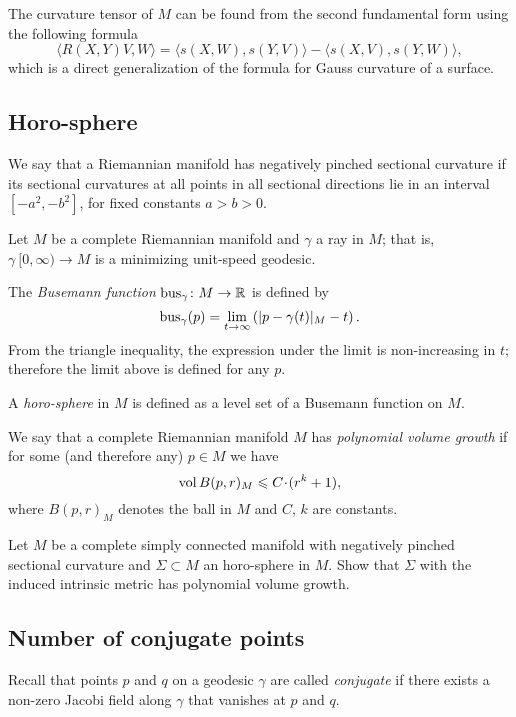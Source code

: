 The curvature tensor of $M$ can be found from the second fundamental form using the following  formula
\[\langle R(X,Y)V,W\rangle=\langle s(X,W),s(Y,V)\rangle-\langle s(X,V),s(Y,W)\rangle,\]
which is a direct generalization of the formula for Gauss curvature of a surface.


\subsection*{Horo-sphere}
\label{Horosphere}

We say that a Riemannian manifold has negatively pinched sectional curvature if its sectional curvatures at all points in all sectional directions lie in an interval $[-a^2, -b^2]$, for fixed constants $a>b>0$.

Let $M$ be a complete Riemannian manifold
and $\gamma$ a ray in $M$; 
that is, $\gamma\:[0, \infty)\to M$ is a minimizing unit-speed geodesic.

The \label{page:Busemann function}\emph{Busemann function} $\operatorname{\rm bus}\nolimits_\gamma\colon M\to\mathbb{R}$ is defined by
$$\operatorname{\rm bus}\nolimits_\gamma(p)=\lim_{t\to\infty}\left(|p-\gamma(t)|_M-t\right).$$
From the triangle inequality, 
the expression under the limit is non-increasing in $t$; 
therefore  the limit above is defined for any $p$.

A \emph{horo-sphere} in $M$ is defined as a level set of a Busemann function
on $M$.

We say that a complete Riemannian manifold $M$ has \emph{polynomial volume growth} if for some (and therefore any) $p\in M$ we have 
$$\vol B(p,r)_M\z\le C\cdot (r^k+1),$$ 
where $B(p,r)_M$ denotes the ball in $M$ and  $C$, $k$ are constants.

\begin{pr} Let $M$ be a complete simply connected manifold with negatively pinched sectional curvature
and $\Sigma\subset M$ an horo-sphere in $M$.
Show that
$\Sigma$ with the induced intrinsic metric 
has polynomial volume growth.
\end{pr}

\subsection*{Number of conjugate points}
\label{Number of conjugate points}

Recall that points $p$ and $q$ on a geodesic $\gamma$ are called \emph{conjugate} if there exists a non-zero Jacobi field along $\gamma$ that vanishes at $p$ and $q$. 

